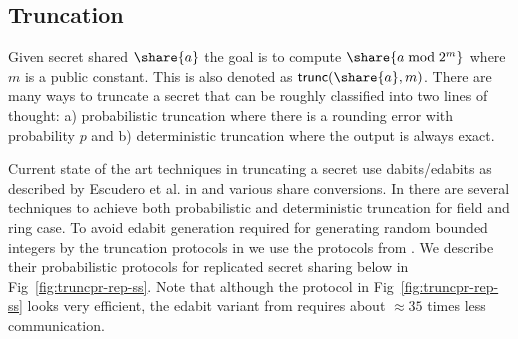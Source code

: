 \subsection{Truncation}
Given secret shared $\share{a}$ the goal is to compute $\share{a \bmod 2^m}$
where $m$ is a public constant. This is also denoted as
$\mathsf{trunc}(\share{a}, m)$. There are many ways to truncate a secret that
can be roughly classified into two lines of thought: a) probabilistic
truncation where there is a rounding error with probability $p$ and b) deterministic
truncation where the output is always exact.

Current state of the art techniques in truncating a secret use
dabits/edabits as described by Escudero et al. in \cite{C:EGKRS20} and
various share conversions. In \cite{C:EGKRS20} there are several techniques
to achieve both probabilistic and deterministic truncation for field and ring
case. To avoid edabit generation required for generating random bounded integers
by the truncation protocols in \cite{C:EGKRS20} we use the protocols from
\cite{PoPETS:DalEscKel20}. We describe their probabilistic protocols for replicated secret
sharing below in Fig~\ref{fig:truncpr-rep-ss}.
Note that although the protocol in Fig~\ref{fig:truncpr-rep-ss} looks
very efficient, the edabit variant from \cite{C:EGKRS20} requires
about $\approx 35$ times less communication. 



